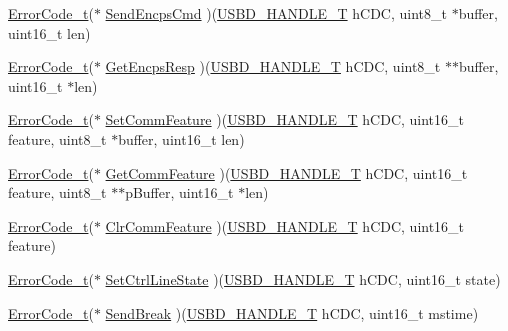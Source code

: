 \begin{DoxyCompactItemize}
\item 
\hyperlink{error_8h_a905255056c349318139d94aa4523d516}{Error\+Code\+\_\+t}($\ast$ \hyperlink{struct_u_s_b_d___c_d_c___i_n_i_t___p_a_r_a_m_a3722a6599dc056cd6b3343b9fbcf04b0}{Send\+Encps\+Cmd} )(\hyperlink{group___u_s_b_d___core_gafdbb2204d929cb9d75736bd2b42342ac}{U\+S\+B\+D\+\_\+\+H\+A\+N\+D\+L\+E\+\_\+T} h\+C\+DC, uint8\+\_\+t $\ast$buffer, uint16\+\_\+t len)
\item 
\hyperlink{error_8h_a905255056c349318139d94aa4523d516}{Error\+Code\+\_\+t}($\ast$ \hyperlink{struct_u_s_b_d___c_d_c___i_n_i_t___p_a_r_a_m_a50f19d3a3bfac1e1d6525d44ecb8063a}{Get\+Encps\+Resp} )(\hyperlink{group___u_s_b_d___core_gafdbb2204d929cb9d75736bd2b42342ac}{U\+S\+B\+D\+\_\+\+H\+A\+N\+D\+L\+E\+\_\+T} h\+C\+DC, uint8\+\_\+t $\ast$$\ast$buffer, uint16\+\_\+t $\ast$len)
\item 
\hyperlink{error_8h_a905255056c349318139d94aa4523d516}{Error\+Code\+\_\+t}($\ast$ \hyperlink{struct_u_s_b_d___c_d_c___i_n_i_t___p_a_r_a_m_a1e5fcd48c821d9af9b4a422e9847d636}{Set\+Comm\+Feature} )(\hyperlink{group___u_s_b_d___core_gafdbb2204d929cb9d75736bd2b42342ac}{U\+S\+B\+D\+\_\+\+H\+A\+N\+D\+L\+E\+\_\+T} h\+C\+DC, uint16\+\_\+t feature, uint8\+\_\+t $\ast$buffer, uint16\+\_\+t len)
\item 
\hyperlink{error_8h_a905255056c349318139d94aa4523d516}{Error\+Code\+\_\+t}($\ast$ \hyperlink{struct_u_s_b_d___c_d_c___i_n_i_t___p_a_r_a_m_ab8edfef92cb0d830a742a68d96e10952}{Get\+Comm\+Feature} )(\hyperlink{group___u_s_b_d___core_gafdbb2204d929cb9d75736bd2b42342ac}{U\+S\+B\+D\+\_\+\+H\+A\+N\+D\+L\+E\+\_\+T} h\+C\+DC, uint16\+\_\+t feature, uint8\+\_\+t $\ast$$\ast$p\+Buffer, uint16\+\_\+t $\ast$len)
\item 
\hyperlink{error_8h_a905255056c349318139d94aa4523d516}{Error\+Code\+\_\+t}($\ast$ \hyperlink{struct_u_s_b_d___c_d_c___i_n_i_t___p_a_r_a_m_a4564c92d967b03f85870e940ad7d67b3}{Clr\+Comm\+Feature} )(\hyperlink{group___u_s_b_d___core_gafdbb2204d929cb9d75736bd2b42342ac}{U\+S\+B\+D\+\_\+\+H\+A\+N\+D\+L\+E\+\_\+T} h\+C\+DC, uint16\+\_\+t feature)
\item 
\hyperlink{error_8h_a905255056c349318139d94aa4523d516}{Error\+Code\+\_\+t}($\ast$ \hyperlink{struct_u_s_b_d___c_d_c___i_n_i_t___p_a_r_a_m_ab73f0f1c6bf0957cb72bb57a481fc847}{Set\+Ctrl\+Line\+State} )(\hyperlink{group___u_s_b_d___core_gafdbb2204d929cb9d75736bd2b42342ac}{U\+S\+B\+D\+\_\+\+H\+A\+N\+D\+L\+E\+\_\+T} h\+C\+DC, uint16\+\_\+t state)
\item 
\hyperlink{error_8h_a905255056c349318139d94aa4523d516}{Error\+Code\+\_\+t}($\ast$ \hyperlink{struct_u_s_b_d___c_d_c___i_n_i_t___p_a_r_a_m_a1ae8501d22f581ca8f756f068fb1c506}{Send\+Break} )(\hyperlink{group___u_s_b_d___core_gafdbb2204d929cb9d75736bd2b42342ac}{U\+S\+B\+D\+\_\+\+H\+A\+N\+D\+L\+E\+\_\+T} h\+C\+DC, uint16\+\_\+t mstime)

\end{DoxyCompactItemize}
